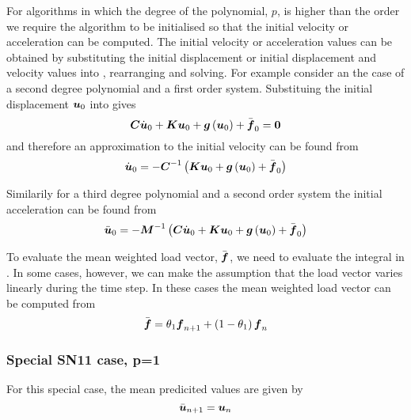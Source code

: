 For algorithms in which the degree of the polynomial, $p$, is higher than the
order we require the algorithm to be initialised so that the initial velocity
or acceleration can be computed. The initial velocity or acceleration values
can be obtained by substituting the initial displacement or initial
displacement and velocity values into ,
rearranging and solving. For example consider an the case of a second degree
polynomial and a first order system. Substituing the initial displacement
$\boldsymbol{u}_{0}$ into  gives
\begin{equation}
  \matr{C}\dot{\vectr{u}}_{0}+\matr{K}\vectr{u}_{0}+\fnof{\vectr{g}}{\vectr{u}_{0}}+\bar{\vectr{f}}_{0}=\vectr{0}
\end{equation}
and therefore an approximation to the initial velocity can be found from
\begin{equation}
  \dot{\vectr{u}}_{0}=-\inverse{\matr{C}}\pbrac{\matr{K}\vectr{u}_{0}+\fnof{\vectr{g}}{\vectr{u}_{0}}+\bar{\vectr{f}}_{0}}
\end{equation}

Similarily for a third degree polynomial and a second order system the initial
acceleration can be found from
\begin{equation}
  \ddot{\vectr{u}}_{0}=-\inverse{\matr{M}}\pbrac{\matr{C}\dot{\vectr{u}}_{0}+\matr{K}\vectr{u}_{0}+
    \fnof{\vectr{g}}{\vectr{u}_{0}}+\bar{\vectr{f}}_{0}}
\end{equation}

To evaluate the mean weighted load vector, $\bar{\boldsymbol{f}}$, we need to
evaluate the integral in . In some cases,
however, we can make the assumption that the load vector varies linearly
during the time step. In these cases the mean weighted load vector can be
computed from
\begin{equation}
  \bar{\boldsymbol{f}}=\theta_{1}\boldsymbol{f}_{n+1}+\left( 1-\theta_{1} \right)\boldsymbol{f}_{n}
\end{equation}

\subsubsection{Special SN11 case, p=1}

For this special case, the mean predicited values are given by
\begin{equation}
   \bar{\boldsymbol{u}}_{n+1} = \boldsymbol{u}_{n}
\end{equation}

